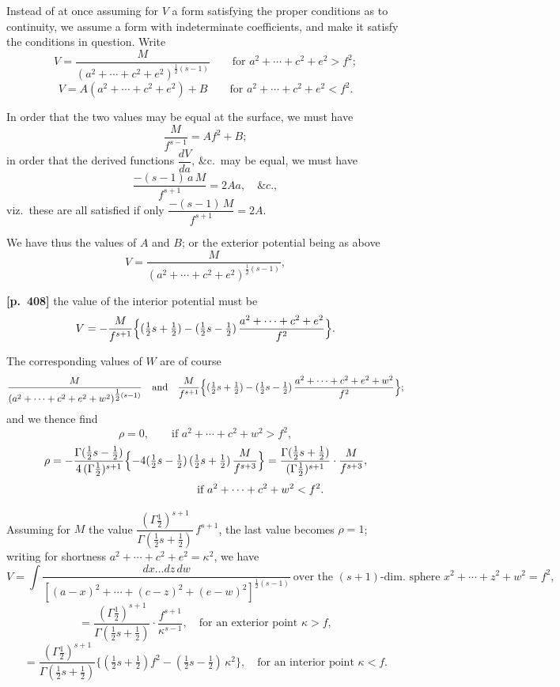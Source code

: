 \documentclass[11pt,a4paper]{article}
\begin{document}
Instead of at once assuming for $V$ a form satisfying the proper conditions as to continuity, we assume a form with indeterminate coefficients, and make it satisfy the conditions in question. Write
\[
V = \frac{M}{(a^{2}+\cdots+c^{2}+e^{2})^{\tfrac{1}{2}(s-1)}}\qquad \text{for }a^{2}+\cdots+c^{2}+e^{2} > f^{2};
\]
\[
V = A(a^{2}+\cdots+c^{2}+e^{2}) + B \qquad \text{for }a^{2}+\cdots+c^{2}+e^{2} < f^{2}.
\]

In order that the two values may be equal at the surface, we must have
\[
\frac{M}{f^{s-1}} = Af^{2} + B;
\]
in order that the derived functions $\dfrac{dV}{da}$, \&c.\ may be equal, we must have
\[
\frac{-(s-1)\,a\,M}{f^{s+1}} = 2Aa,\quad \&c.,
\]
viz.\ these are all satisfied if only $\dfrac{-(s-1)\,M}{f^{s+1}} = 2A$.

We have thus the values of $A$ and $B$; or the exterior potential being as above
\[
V = \frac{M}{(a^{2}+\cdots+c^{2}+e^{2})^{\tfrac{1}{2}(s-1)}},
\]

\bigskip
\noindent\textbf{[p.~408]}\quad
the value of the interior potential must be
\[
V = -\frac{M}{f^{s+1}}\Bigl\{(\tfrac{1}{2}s + \tfrac{1}{2}) - (\tfrac{1}{2}s - \tfrac{1}{2})\,\frac{a^{2}+\cdots+c^{2}+e^{2}}{f^{2}}\Bigr\}.
\]

The corresponding values of $W$ are of course
\[
\frac{M}{(a^{2}+\cdots+c^{2}+e^{2}+w^{2})^{\tfrac{1}{2}(s-1)}}\quad\text{and}\quad \frac{M}{f^{s+1}}\Bigl\{(\tfrac{1}{2}s + \tfrac{1}{2}) - (\tfrac{1}{2}s - \tfrac{1}{2})\,\frac{a^{2}+\cdots+c^{2}+e^{2}+w^{2}}{f^{2}}\Bigr\};
\]
and we thence find
\[
\rho = 0,\qquad \text{if }a^{2}+\cdots+c^{2}+w^{2} > f^{2},
\]
\[
\rho = -\frac{\Gamma(\tfrac{1}{2}s-\tfrac{1}{2})}{4\,(\Gamma\tfrac{1}{2})^{s+1}}\Bigl\{-4(\tfrac{1}{2}s - \tfrac{1}{2})\,(\tfrac{1}{2}s + \tfrac{1}{2})\,\frac{M}{f^{s+3}}\Bigr\} = \frac{\Gamma(\tfrac{1}{2}s + \tfrac{1}{2})}{(\Gamma\tfrac{1}{2})^{s+1}}\cdot\frac{M}{f^{s+3}},
\]
\[
\hskip 10em \text{if }a^{2}+\cdots+c^{2}+w^{2} < f^{2}.
\]

Assuming for $M$ the value $\dfrac{(\Gamma\tfrac{1}{2})^{s+1}}{\Gamma(\tfrac{1}{2}s+\tfrac{1}{2})}\,f^{s+1}$, the last value becomes $\rho = 1$; writing for shortness $a^{2}+\cdots+c^{2}+e^{2} = \kappa^{2}$, we have
\[
V = \int \frac{dx\ldots dz\,dw}{[(a-x)^{2}+\cdots+(c-z)^{2}+(e-w)^{2}]^{\tfrac{1}{2}(s-1)}}\ \text{over the }(s+1)\text{-dim.\ sphere }x^{2}+\cdots+z^{2}+w^{2}=f^{2},
\]
\[
= \frac{(\Gamma\tfrac{1}{2})^{s+1}}{\Gamma(\tfrac{1}{2}s + \tfrac{1}{2})}\cdot\frac{f^{s+1}}{\kappa^{s-1}},\quad \text{for an exterior point }\kappa > f,
\]
\[
= \frac{(\Gamma\tfrac{1}{2})^{s+1}}{\Gamma(\tfrac{1}{2}s + \tfrac{1}{2})}\bigl\{(\tfrac{1}{2}s+\tfrac{1}{2})f^{2} - (\tfrac{1}{2}s-\tfrac{1}{2})\,\kappa^{2}\bigr\},\quad \text{for an interior point }\kappa < f.
\]
\end{document}
